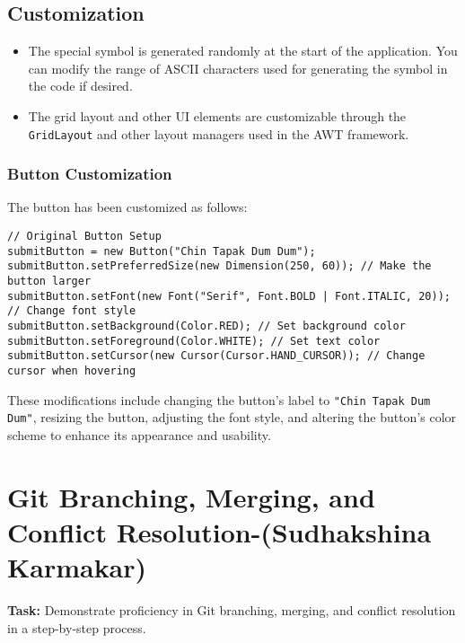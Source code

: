 \documentclass[a4paper,15pt]{article}
\begin{document}
\begin{itemize}[leftmargin=1.5cm]
\subsection{Customization}
\begin{itemize}
    \item The special symbol is generated randomly at the start of the application. You can modify the range of ASCII characters used for generating the symbol in the code if desired.
    \item The grid layout and other UI elements are customizable through the \texttt{GridLayout} and other layout managers used in the AWT framework.
\end{itemize}

\subsubsection{Button Customization}
The button has been customized as follows:

\begin{verbatim}
// Original Button Setup
submitButton = new Button("Chin Tapak Dum Dum");
submitButton.setPreferredSize(new Dimension(250, 60)); // Make the button larger
submitButton.setFont(new Font("Serif", Font.BOLD | Font.ITALIC, 20)); // Change font style
submitButton.setBackground(Color.RED); // Set background color
submitButton.setForeground(Color.WHITE); // Set text color
submitButton.setCursor(new Cursor(Cursor.HAND_CURSOR)); // Change cursor when hovering
\end{verbatim}

These modifications include changing the button's label to \texttt{"Chin Tapak Dum Dum"}, resizing the button, adjusting the font style, and altering the button's color scheme to enhance its appearance and usability.

 \end{itemize}
    \section{ Git Branching, Merging, and Conflict Resolution-(Sudhakshina Karmakar)}

\textbf{Task:} Demonstrate proficiency in Git branching, merging, and conflict resolution in a step-by-step process.
\end{document}
